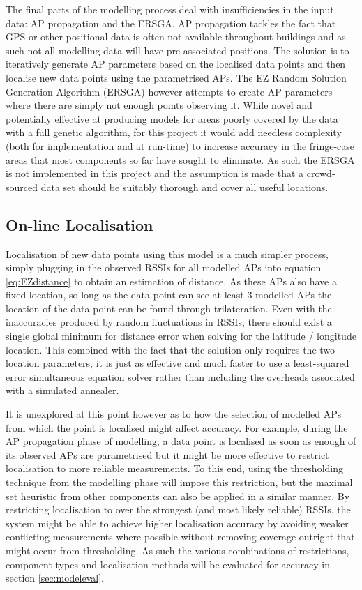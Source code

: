 \documentclass{UoYCSproject}
\begin{document}
                The final parts of the modelling process deal with insufficiencies in the input data: AP propagation and the ERSGA. AP propagation tackles the fact that GPS or other positional data is often not available throughout buildings and as such not all modelling data will have pre-associated positions. The solution is to iteratively generate AP parameters based on the localised data points and then localise new data points using the parametrised APs. The EZ Random Solution Generation Algorithm (ERSGA) however attempts to create AP parameters where there are simply not enough points observing it. While novel and potentially effective at producing models for areas poorly covered by the data with a full genetic algorithm, for this project it would add needless complexity (both for implementation and at run-time) to increase accuracy in the fringe-case areas that most components so far have sought to eliminate. As such the ERSGA is not implemented in this project and the assumption is made that a crowd-sourced data set should be suitably thorough and cover all useful locations.
            
            \subsection{On-line Localisation}
            
	            Localisation of new data points using this model is a much simpler process, simply plugging in the observed RSSIs for all modelled APs into equation \ref{eq:EZdistance} to obtain an estimation of distance. As these APs also have a fixed location, so long as the data point can see at least 3 modelled APs the location of the data point can be found through trilateration. Even with the inaccuracies produced by random fluctuations in RSSIs, there should exist a single global minimum for distance error when solving for the latitude / longitude location. This combined with the fact that the solution only requires the two location parameters, it is just as effective and much faster to use a least-squared error simultaneous equation solver rather than including the overheads associated with a simulated annealer.
	            
	            It is unexplored at this point however as to how the selection of modelled APs from which the point is localised might affect accuracy. For example, during the AP propagation phase of modelling, a data point is localised as soon as enough of its observed APs are parametrised but it might be more effective to restrict localisation to more reliable measurements. To this end, using the thresholding technique from the modelling phase will impose this restriction, but the maximal set heuristic from other components can also be applied in a similar manner. By restricting localisation to over the strongest (and most likely reliable) RSSIs, the system might be able to achieve higher localisation accuracy by avoiding weaker conflicting measurements where possible without removing coverage outright that might occur from thresholding. As such the various combinations of restrictions, component types and localisation methods will be evaluated for accuracy in section \ref{sec:modeleval}.
        
\end{document}
